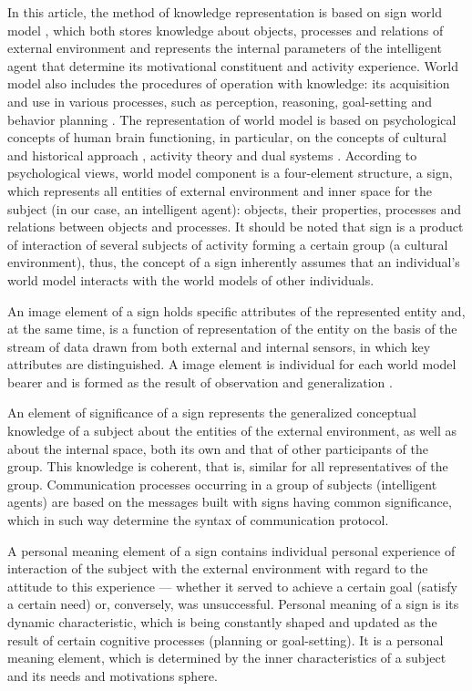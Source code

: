 \documentclass[review]{elsarticle}
\begin{document}
In this article, the method of knowledge representation is based on sign world model  \cite{Osipov2014c,Osipov2015d, Osipov2015c}, which both stores knowledge about objects, processes and relations of external environment and represents the internal parameters of the intelligent agent that determine its motivational constituent and activity experience. World model also includes the procedures of operation with knowledge: its acquisition and use in various processes, such as perception, reasoning, goal-setting and behavior planning \cite{Osipov2015d}. The representation of world model is based on psychological concepts of human brain functioning, in particular, on the concepts of cultural and historical approach \cite{Vygotsky1986}, activity theory \cite{Leontyev2009,Verenikina,Igira2009} and dual systems \cite{Evans2013,Stanovich2009}. According to psychological views, world model component is a four-element structure, a sign, which represents all entities of external environment and inner space for the subject (in our case, an intelligent agent): objects, their properties, processes and relations between objects and processes. It should be noted that sign is a product of interaction of several subjects of activity forming a certain group (a cultural environment), thus, the concept of a sign inherently assumes that an individual's world model interacts with the world models of other individuals.

An image element of a sign holds specific attributes of the represented entity and, at the same time, is a function of representation of the entity on the basis of the stream of data drawn from both external and internal sensors, in which key attributes are distinguished. A image element is individual for each world model bearer and is formed as the result of observation and generalization \cite{Osipov2015d,Skrynnik2016}. 

An element of significance of a sign represents the generalized conceptual knowledge of a subject about the entities of the external environment, as well as about the internal space, both its own and that of other participants of the group. This knowledge is coherent, that is, similar for all representatives of the group. Communication processes occurring in a group of subjects (intelligent agents) are based on the messages built with signs having common significance, which in such way determine the syntax of communication protocol.

A personal meaning element of a sign contains individual personal experience of interaction of the subject with the external environment with regard to the attitude to this experience --- whether it served to achieve a certain goal (satisfy a certain need) or, conversely, was unsuccessful. Personal meaning of a sign is its dynamic characteristic, which is being constantly shaped and updated as the result of certain cognitive processes (planning or goal-setting). It is a personal meaning element, which is determined by the inner characteristics of a subject and its needs and motivations sphere. 
\end{document}
